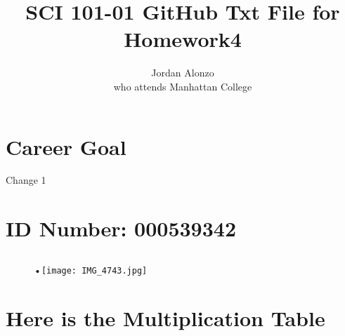 \documentclass[11pt]{article}
\begin{document}
\title{SCI 101-01 GitHub Txt File for Homework4}
\author{Jordan Alonzo\\
who attends Manhattan College}
\maketitle




\section {Career Goal}
Change 1

\section{ID Number: 000539342}
\subsection{}
\begin{figure}[!h]
\begin{center}

•\texttt{[image: IMG\_4743.jpg]}
\end{center}
\end{figure}

\section {Here is the Multiplication Table}
\end{document}
